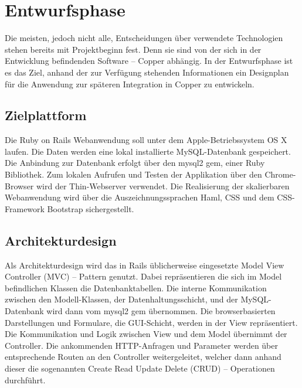 \section{Entwurfsphase} 
\label{sec:Entwurfsphase}
Die meisten, jedoch nicht alle, Entscheidungen über verwendete Technologien stehen bereits mit Projektbeginn fest. Denn sie sind von der sich in der Entwicklung befindenden Software – Copper abhängig. In der Entwurfsphase ist es das Ziel, anhand der zur Verfügung stehenden Informationen ein Designplan für die Anwendung zur späteren Integration in Copper zu entwickeln.

\subsection{Zielplattform}
\label{sec:Zielplattform}
Die Ruby on Rails Webanwendung soll unter dem Apple-Betriebssystem OS X laufen. Die Daten werden eine lokal installierte MySQL-Datenbank gespeichert. Die Anbindung zur Datenbank erfolgt über den mysql2 gem, einer Ruby Bibliothek. Zum lokalen Aufrufen und Testen der Applikation über den Chrome-Browser wird der Thin-Webserver verwendet. Die Realisierung der skalierbaren Webanwendung wird über die Auszeichnungssprachen Haml, CSS und dem CSS-Framework Bootstrap sichergestellt.

\subsection{Architekturdesign}
\label{sec:Architekturdesign}
Als Architekturdesign wird das in Rails üblicherweise eingesetzte Model View Controller (MVC) – Pattern genutzt. Dabei repräsentieren die sich im Model befindlichen Klassen die Datenbanktabellen. Die interne Kommunikation zwischen den Modell-Klassen, der Datenhaltungsschicht, und der MySQL-Datenbank wird dann vom mysql2 gem übernommen. Die browserbasierten Darstellungen und Formulare, die GUI-Schicht, werden in der View repräsentiert. Die Kommunikation und Logik zwischen View und dem Model übernimmt der Controller. Die ankommenden HTTP-Anfragen und Parameter werden über entsprechende Routen an den Controller weitergeleitet, welcher dann anhand dieser die sogenannten Create Read Update Delete (CRUD) – Operationen durchführt.

